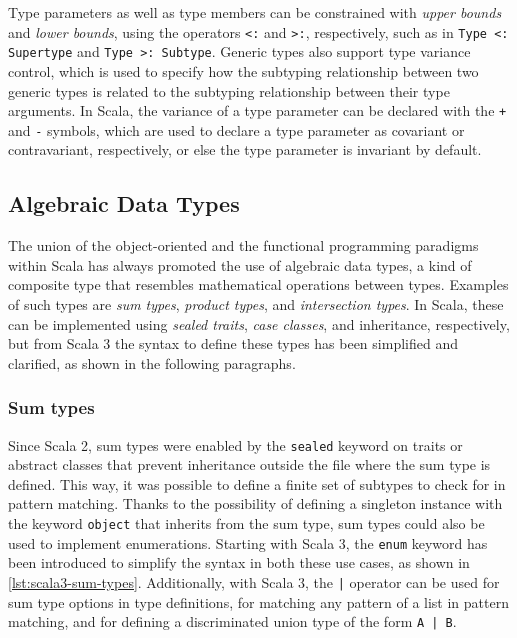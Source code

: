 Type parameters as well as type members can be constrained with \textit{upper bounds} and \textit{lower bounds}, using the operators \texttt{<:} and \texttt{>:}, respectively, such as in \texttt{Type <: Supertype} and \texttt{Type >: Subtype}.
%
Generic types also support type variance control, which is used to specify how the subtyping relationship between two generic types is related to the subtyping relationship between their type arguments.
%
In Scala, the variance of a type parameter can be declared with the \texttt{+} and \texttt{-} symbols, which are used to declare a type parameter as covariant or contravariant, respectively, or else the type parameter is invariant by default.

\subsection{Algebraic Data Types}

The union of the object-oriented and the functional programming paradigms within Scala has always promoted the use of algebraic data types, a kind of composite type that resembles mathematical operations between types.
%
Examples of such types are \textit{sum types}, \textit{product types}, and \textit{intersection types}.
%
In Scala, these can be implemented using \textit{sealed traits}, \textit{case classes}, and inheritance, respectively, but from Scala 3 the syntax to define these types has been simplified and clarified, as shown in the following paragraphs.

\subsubsection{Sum types}

Since Scala 2, sum types were enabled by the \texttt{sealed} keyword on traits or abstract classes that prevent inheritance outside the file where the sum type is defined.
%
This way, it was possible to define a finite set of subtypes to check for in pattern matching.
%
Thanks to the possibility of defining a singleton instance with the keyword \texttt{object} that inherits from the sum type, sum types could also be used to implement enumerations.
%
Starting with Scala 3, the \texttt{enum} keyword has been introduced to simplify the syntax in both these use cases, as shown in \cref{lst:scala3-sum-types}.
%
Additionally, with Scala 3, the \texttt{|} operator can be used for sum type options in type definitions, for matching any pattern of a list in pattern matching, and for defining a discriminated union type of the form \texttt{A | B}.

